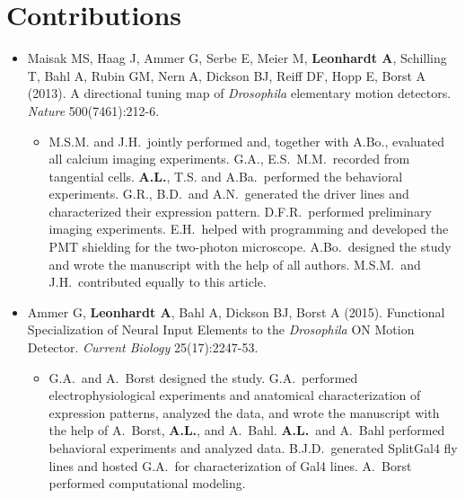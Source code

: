 \chapter*{Contributions}

\begin{itemize}
    
    \item Maisak MS, Haag J, Ammer G, Serbe E, Meier M, \textbf{Leonhardt A}, Schilling T, Bahl A, Rubin GM, Nern A, Dickson BJ, Reiff DF, Hopp E, Borst A (2013). A directional tuning map of \textit{Drosophila} elementary motion detectors. \textit{Nature} 500(7461):212-6.
    
    \begin{itemize}
        \item
        M.S.M. and J.H.\ jointly performed and, together with A.Bo., evaluated all calcium imaging experiments. G.A., E.S.\, M.M.\ recorded from tangential cells. \textbf{A.L.}, T.S. and A.Ba.\ performed the behavioral experiments. G.R., B.D.\ and A.N.\ generated the driver lines and characterized their expression pattern. D.F.R.\ performed preliminary imaging experiments. E.H.\ helped with programming and developed the PMT shielding for the two-photon microscope. A.Bo.\ designed the study and wrote the manuscript with the help of all authors. M.S.M.\ and J.H.\ contributed equally to this article.
    \end{itemize}
    
    \item Ammer G, \textbf{Leonhardt A}, Bahl A, Dickson BJ, Borst A (2015). Functional Specialization of Neural Input Elements to the \textit{Drosophila} ON Motion Detector. \textit{Current Biology} 25(17):2247-53.
    
    \begin{itemize}
        \item
        G.A.\ and A.\ Borst designed the study. G.A.\ performed electrophysiological experiments and anatomical characterization of expression patterns, analyzed the data, and wrote the manuscript with the help of A.\ Borst, \textbf{A.L.}, and A.\ Bahl. \textbf{A.L.}\ and A.\ Bahl performed behavioral experiments and analyzed data. B.J.D.\ generated SplitGal4 fly lines and hosted G.A.\ for characterization of Gal4 lines. A.\ Borst performed computational modeling.
    \end{itemize}
    

\end{itemize}
